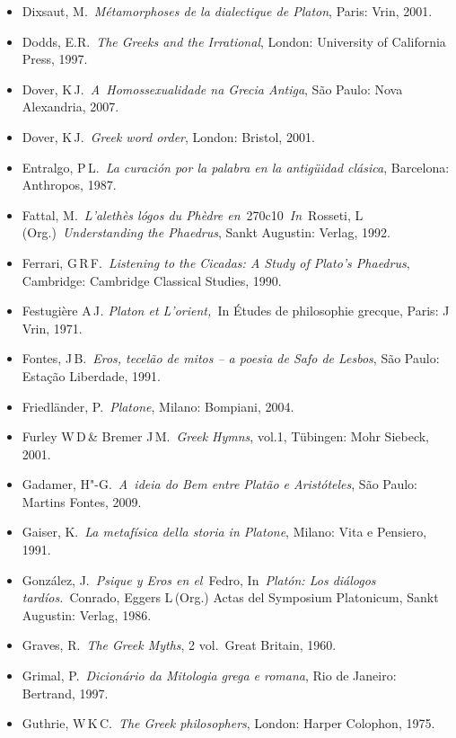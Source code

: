 {\begin{itemize}
  Diels, Herman \& Kranz, Walther.~\emph{Die fragmente der
  vorsokratiker}, 3 vol.~Berlin: Weidmann, 1989.
\item
  Dixsaut, M.~\emph{Métamorphoses de la dialectique de Platon}, Paris:
  Vrin, 2001.
\item
  Dodds, E.R.~\emph{The Greeks and the Irrational}, London: University
  of California Press, 1997.
\item
  Dover, K\,J.~\emph{A~Homossexualidade na Grecia Antiga}, São Paulo:
  Nova Alexandria, 2007.
\item
  Dover, K\,J.~\emph{Greek word order}, London: Bristol, 2001.
\item
  Entralgo, P\,L.~\emph{La curación por la palabra en la antigüidad
  clásica}, Barcelona: Anthropos, 1987.
\item
  Fattal, M.~\emph{L'alethès lógos du Phèdre
  en}~270c10~\emph{In}~Rosseti, L\,(Org.)~\emph{Understanding the
  Phaedrus}, Sankt Augustin: Verlag, 1992.
\item
  Ferrari, G\,R\,F.~\emph{Listening to the Cicadas: A Study of Plato's
  Phaedrus}, Cambridge: Cambridge Classical Studies, 1990.
\item
  Festugière A\,J\emph{. Platon et L'orient,~}In Études de philosophie
  grecque, Paris: J\,Vrin, 1971.
\item
  Fontes, J\,B.~\emph{Eros, tecelão de mitos -- a poesia de Safo de
  Lesbos}, São Paulo: Estação Liberdade, 1991.
\item
  Friedländer, P.~\emph{Platone}, Milano: Bompiani, 2004.
\item
  Furley W\,D\,\& Bremer J\,M.~\emph{Greek Hymns}, vol.1, Tübingen: Mohr
  Siebeck, 2001.
\item
  Gadamer, H"-G.~\emph{A~ideia do Bem entre Platão e Aristóteles}, São
  Paulo: Martins Fontes, 2009.
\item
  Gaiser, K.~\emph{La metafísica della storia in Platone}, Milano: Vita
  e Pensiero, 1991.
\item
  González, J.~\emph{Psique y Eros en el~}Fedro, In~\emph{Platón: Los
  diálogos tardíos.}~Conrado, Eggers L\,(Org.) Actas del Symposium
  Platonicum, Sankt Augustin: Verlag, 1986.
\item
  Graves, R.~\emph{The Greek Myths}, 2 vol.~Great Britain, 1960.
\item
  Grimal, P.~\emph{Dicionário da Mitologia grega e romana}, Rio de
  Janeiro: Bertrand, 1997.
\item
  Guthrie, W\,K\,C.~\emph{The Greek philosophers}, London: Harper
  Colophon, 1975.

\end{itemize}}
